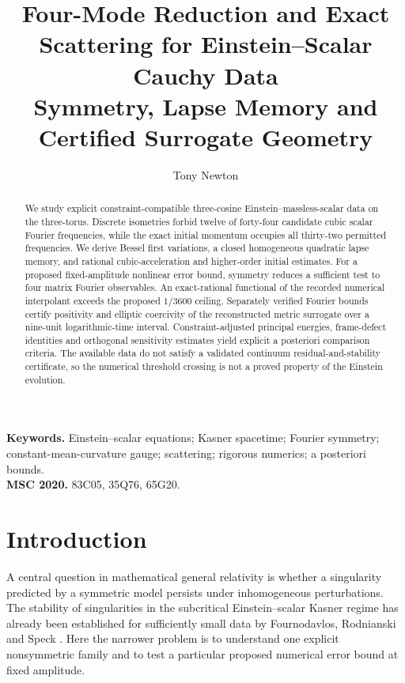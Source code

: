 \documentclass[11pt,a4paper]{article}
\title{Four-Mode Reduction and Exact Scattering for Einstein--Scalar Cauchy Data\\[3pt]\large Symmetry, Lapse Memory and Certified Surrogate Geometry}
\author{Tony Newton}
\date{}
\theoremstyle{remark}
\begin{document}
\maketitle
\begin{abstract}
We study explicit constraint-compatible three-cosine Einstein--massless-scalar data on the three-torus. Discrete isometries forbid twelve of forty-four candidate cubic scalar Fourier frequencies, while the exact initial momentum occupies all thirty-two permitted frequencies. We derive Bessel first variations, a closed homogeneous quadratic lapse memory, and rational cubic-acceleration and higher-order initial estimates. For a proposed fixed-amplitude nonlinear error bound, symmetry reduces a sufficient test to four matrix Fourier observables. An exact-rational functional of the recorded numerical interpolant exceeds the proposed $1/3600$ ceiling. Separately verified Fourier bounds certify positivity and elliptic coercivity of the reconstructed metric surrogate over a nine-unit logarithmic-time interval. Constraint-adjusted principal energies, frame-defect identities and orthogonal sensitivity estimates yield explicit a posteriori comparison criteria. The available data do not satisfy a validated continuum residual-and-stability certificate, so the numerical threshold crossing is not a proved property of the Einstein evolution.
\end{abstract}
\vspace{1em}
\noindent\textbf{Keywords.} Einstein--scalar equations; Kasner spacetime; Fourier symmetry; constant-mean-curvature gauge; scattering; rigorous numerics; a posteriori bounds.\\
\noindent\textbf{MSC 2020.} 83C05, 35Q76, 65G20.


\section{Introduction}
A central question in mathematical general relativity is whether a singularity predicted by a symmetric model persists under inhomogeneous perturbations. The stability of singularities in the subcritical Einstein--scalar Kasner regime has already been established for sufficiently small data by Fournodavlos, Rodnianski and Speck \cite{FRS}. Here the narrower problem is to understand one explicit nonsymmetric family and to test a particular proposed numerical error bound at fixed amplitude.
\end{document}
